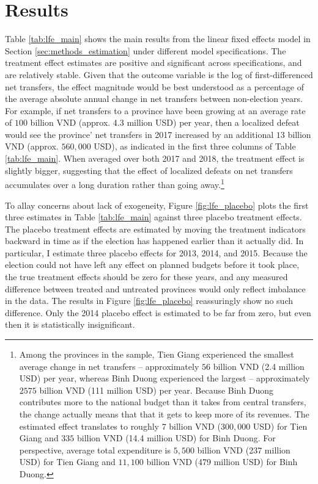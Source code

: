 \documentclass[12pt]{article}
\newcommand\fnote[1]{\footnote{\baselineskip=2\normalbaselineskip#1}}
\newcommand{\1}{\mathbbm{1}}
\begin{document}


\section{Results}
\label{sec:results}


Table \ref{tab:lfe_main} shows the main results from the linear fixed effects model in Section \ref{sec:methods_estimation} under different model specifications. The treatment effect estimates are positive and significant across specifications, and are relatively stable. Given that the outcome variable is the log of first-differenced net transfers, the effect magnitude would be best understood as a percentage of the average absolute annual change in net transfers between non-election years. For example, if net transfers to a province have been growing at an average rate of $100$ billion VND (approx. 4.3 million USD) per year, then a localized defeat would see the province' net transfers in 2017 increased by an additional $13$ billion VND (approx. $560,000$ USD), as indicated in the first three columns of Table \ref{tab:lfe_main}. When averaged over both 2017 and 2018, the treatment effect is slightly bigger, suggesting that the effect of localized defeats on net transfers accumulates over a long duration rather than going away.\fnote{Among the provinces in the sample, Tien Giang experienced the smallest average change in net transfers -- approximately $56$ billion VND (2.4 million USD) per year, whereas Binh Duong experienced the largest -- approximately $2575$ billion VND (111 million USD) per year. Because Binh Duong contributes more to the national budget than it takes from central transfers, the change actually means that that it gets to keep more of its revenues. The estimated effect translates to roughly $7$ billion VND ($300,000$ USD) for Tien Giang and $335$ billion VND (14.4 million USD) for Binh Duong. For perspective, average total expenditure is $5,500$ billion VND (237 million USD) for Tien Giang and $11,100$ billion VND (479 million USD) for Binh Duong.}

To allay concerns about lack of exogeneity, Figure \ref{fig:lfe_placebo} plots the first three estimates in Table \ref{tab:lfe_main} against three placebo treatment effects. The placebo treatment effects are estimated by moving the treatment indicators backward in time as if the election has happened earlier than it actually did. In particular, I estimate three placebo effects for 2013, 2014, and 2015. Because the election could not have left any effect on planned budgets before it took place, the true treatment effects should be zero for these years, and any measured difference between treated and untreated provinces would only reflect imbalance in the data. The results in Figure \ref{fig:lfe_placebo} reassuringly show no such difference. Only the 2014 placebo effect is estimated to be far from zero, but even then it is statistically insignificant.
\end{document}
